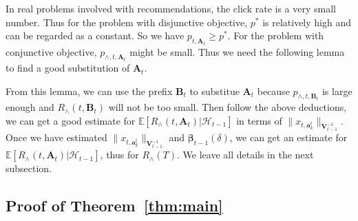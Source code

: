 \documentclass{article}
\newcommand{\bbeta}{\boldsymbol{\beta}}
\newcommand{\EE}{\mathbb{E}}
\newcommand{\bA}{\mathbf{A}}
\newcommand{\ba}{\mathbf{a}}
\newcommand{\bB}{\mathbf{B}}
\newcommand{\bV}{\mathbf{V}}
\newcommand{\cH}{\mathcal{H}}
\newcommand{\abs}[1]{\left| #1 \right|}
\newcommand{\norm}[1]{\| #1 \|}
\newtheorem{lemma}[theorem]{Lemma}%
\begin{document}
{In real problems involved with recommendations, the click rate is a very small number. Thus for the problem with disjunctive objective, $p^*$ is relatively high and can be regarded as a constant. So we have $p_{t, \bA_t} \geq p^*$. For the problem with conjunctive objective, $p_{\wedge, t, \bA_t}$ might be small. Thus we need the following lemma to find a good substitution of $\bA_t$.

From this lemma, we can use the prefix $\bB_t$ to substitue $\bA_t$ because $p_{\wedge, t, \bB_t}$ is large enough and $R_{\wedge}(t, \bB_t)$ will not be too small. Then follow the above deductions, we can get a good estimate for $\EE[R_{\wedge}(t, \bA_t)|\cH_{t-1}]$ in terms of $\norm{x_{t,\ba_k^t}}_{\bV_{t-1}^{-1}}$. Once we have estimated $\norm{x_{t,\ba_k^t}}_{\bV_{t-1}^{-1}}$ and $\bbeta_{t-1}(\delta)$, we can get an estimate for $\EE[R_{\wedge}(t, \bA_t)|\cH_{t-1}]$, thus for $R_{\wedge}(T)$. We leave all details in the next subsection.
}

\subsection{Proof of Theorem~\ref{thm:main}}
\end{document}
